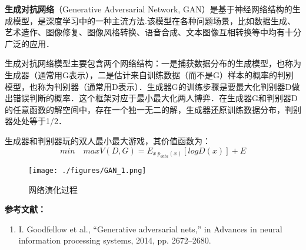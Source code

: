 
\textbf{生成对抗网络}（Generative Adversarial Network, GAN）是基于神经网络结构的生成模型，是深度学习中的一种主流方法.该模型在各种问题场景，比如数据生成、艺术造作、图像修复、图像风格转换、语音合成、文本图像互相转换等中均有十分广泛的应用．

生成对抗网络模型主要包含两个网络结构：一是捕获数据分布的生成模型，也称为生成器（通常用G表示），二是估计来自训练数据（而不是G）样本的概率的判别模型，也称为判别器（通常用D表示）．生成器G的训练步骤是要最大化判别器D做出错误判断的概率．这个框架对应于最小最大化两人博弈．在生成器G和判别器D的任意函数的解空间中，存在一个独一无二的解，生成器还原训练数据分布，判别器处处等于1/2．

生成器和判别器玩的双人最小最大游戏，其价值函数为：
\begin{equation}
min \quad maxV(D,G)=E_{x ~ p_{data}(x)}[logD(x)]+E
\end{equation}

\begin{figure}[ht]
\centering
\texttt{[image: ./figures/GAN\_1.png]}
\caption{网络演化过程} \label{GAN_fig1}
\end{figure}





\textbf{参考文献：}
\begin{enumerate}
\item I. Goodfellow et al., “Generative adversarial nets,” in Advances in neural information processing systems, 2014, pp. 2672–2680.
\end{enumerate}